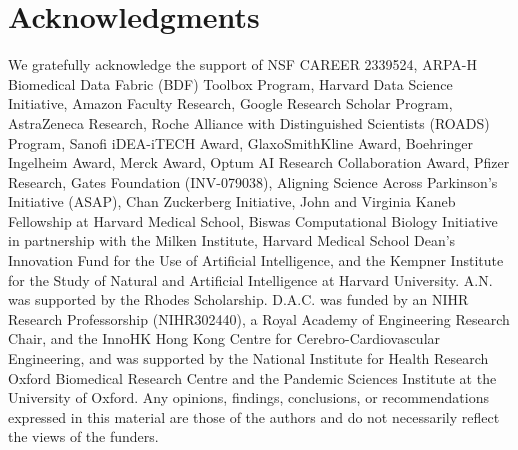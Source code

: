 \section*{Acknowledgments}

We gratefully acknowledge the support of NSF CAREER 2339524, ARPA-H Biomedical Data Fabric (BDF) Toolbox Program, Harvard Data Science Initiative, Amazon Faculty Research, Google Research Scholar Program, AstraZeneca Research, Roche Alliance with Distinguished Scientists (ROADS) Program, Sanofi iDEA-iTECH Award, GlaxoSmithKline Award, Boehringer Ingelheim Award, Merck Award, Optum AI Research Collaboration Award, Pfizer Research, Gates Foundation (INV-079038), Aligning Science Across Parkinson's Initiative (ASAP), Chan Zuckerberg Initiative, John and Virginia Kaneb Fellowship at Harvard Medical School, Biswas Computational Biology Initiative in partnership with the Milken Institute, Harvard Medical School Dean’s Innovation Fund for the Use of Artificial Intelligence, and the Kempner Institute for the Study of Natural and Artificial Intelligence at Harvard University. 
A.N. was supported by the Rhodes Scholarship.
D.A.C. was funded by an NIHR Research Professorship (NIHR302440), a Royal Academy of Engineering Research Chair, and the InnoHK Hong Kong Centre for Cerebro-Cardiovascular Engineering, and was supported by the National Institute for Health Research Oxford Biomedical Research Centre and the Pandemic Sciences Institute at the University of Oxford.
Any opinions, findings, conclusions, or recommendations expressed in this material are those of the authors and do not necessarily reflect the views of the funders.
